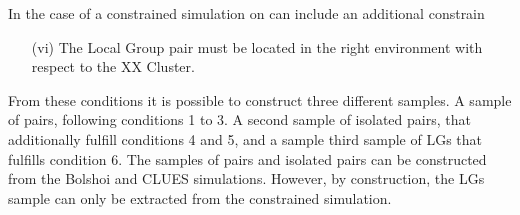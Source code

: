 \documentclass[usenatbib]{latex/mn2e}
\begin{document}
In the case of a constrained simulation on can include an additional 
constrain


\begin{enumerate}
\item[(vi)]{The Local Group pair must be located in the right environment 
with respect to the XX Cluster.}
\end{enumerate}


From these conditions it is possible to construct three different samples.
A sample of pairs, following conditions 1 to 3. A second sample of 
isolated pairs, that additionally fulfill conditions 4 and 5, and a sample 
third sample of LGs that fulfills condition 6. The samples of pairs and 
isolated pairs can be constructed from the Bolshoi and CLUES simulations. 
However, by construction, the LGs sample can only be extracted from the 
constrained simulation.
\end{document}
